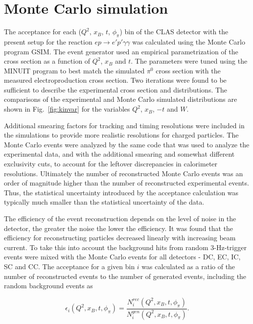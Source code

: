 \documentclass[prc,floatfix,twocolumn,superscriptaddress,letter]{revtex4}
\begin{document}
\section{Monte Carlo simulation}

The acceptance for each ($Q^2$, $x_B$, $t$, $\phi_\pi$) bin of the CLAS detector with the present setup for the reaction $ep\rightarrow e'p'\gamma\gamma$ was calculated using the Monte Carlo program GSIM. The event generator used an empirical parametrization of the cross section as a function  of $Q^2$, $x_B$ and $t$. The parameters were tuned using the MINUIT program to best match the  simulated $\pi^0$ cross section with the measured  electroproduction cross section. 
Two iterations were found to be sufficient to describe the experimental cross section and distributions.  The comparisons of the experimental and Monte Carlo simulated distributions are shown in Fig.~\ref{fig:kinvar} for the variables $Q^2$, $x_B$, $-t$ and $W$.

Additional smearing factors for tracking and timing resolutions were included in the simulations to provide more realistic resolutions for charged particles. The Monte Carlo events were analyzed by the same code that was used to analyze the experimental data, and with the additional smearing and somewhat different exclusivity cuts, to account for the leftover discrepancies in calorimeter resolutions. Ultimately the number of reconstructed Monte Carlo events  was an order of magnitude higher  than the number of reconstructed experimental events.  Thus, the statistical uncertainty introduced by the acceptance calculation was typically much smaller than the statistical uncertainty of the data.

The efficiency of the event reconstruction depends on the level of noise in the detector, the greater the noise the lower the efficiency. It was found that the efficiency for reconstructing particles decreased linearly with increasing beam current.
To take this into account the background hits from random 3-Hz-trigger events  were mixed with the Monte Carlo events for all detectors - DC, EC, IC, SC and CC.
The acceptance for a given bin  $i$  was calculated as a ratio of the number of reconstructed events to the number of generated events, including the random background events as

\begin{equation}
\epsilon_i(Q^2,x_B,t,\phi_\pi)=\frac {N^{rec}_i(Q^2,x_B,t,\phi_\pi)}{N^{gen}_i(Q^2,x_B,t,\phi_\pi)}.
\end{equation}
\end{document}
